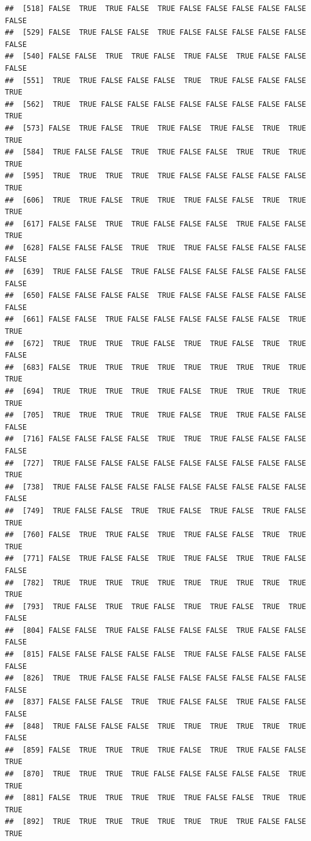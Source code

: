 \documentclass{article}\usepackage[]{graphicx}\usepackage[]{color}
\makeatletter
\newenvironment{kframe}{%
 \def\at@end@of@kframe{}%
 \ifinner\ifhmode%
  \def\at@end@of@kframe{\end{minipage}}%
  \begin{minipage}{\columnwidth}%
 \fi\fi%
 \def\FrameCommand##1{\hskip\@totalleftmargin \hskip-\fboxsep
 \colorbox{shadecolor}{##1}\hskip-\fboxsep
     \hskip-\linewidth \hskip-\@totalleftmargin \hskip\columnwidth}%
 \MakeFramed {\advance\hsize-\width
   \@totalleftmargin\z@ \linewidth\hsize
   \@setminipage}}%
 {\par\unskip\endMakeFramed%
 \at@end@of@kframe}
\newenvironment{knitrout}{}{} %
\makeatother
\begin{document}
\begin{knitrout}
\begin{kframe}
\begin{verbatim}
##  [518] FALSE  TRUE  TRUE FALSE  TRUE FALSE FALSE FALSE FALSE FALSE FALSE
##  [529] FALSE  TRUE FALSE FALSE  TRUE FALSE FALSE FALSE FALSE FALSE FALSE
##  [540] FALSE FALSE  TRUE  TRUE FALSE  TRUE FALSE  TRUE FALSE FALSE FALSE
##  [551]  TRUE  TRUE FALSE FALSE FALSE  TRUE  TRUE FALSE FALSE FALSE  TRUE
##  [562]  TRUE  TRUE FALSE FALSE FALSE FALSE FALSE FALSE FALSE FALSE  TRUE
##  [573] FALSE  TRUE FALSE  TRUE  TRUE FALSE  TRUE FALSE  TRUE  TRUE  TRUE
##  [584]  TRUE FALSE FALSE  TRUE  TRUE FALSE FALSE  TRUE  TRUE  TRUE  TRUE
##  [595]  TRUE  TRUE  TRUE  TRUE  TRUE FALSE FALSE FALSE FALSE FALSE  TRUE
##  [606]  TRUE  TRUE FALSE  TRUE  TRUE  TRUE FALSE FALSE  TRUE  TRUE  TRUE
##  [617] FALSE FALSE  TRUE  TRUE FALSE FALSE FALSE  TRUE FALSE FALSE  TRUE
##  [628] FALSE FALSE FALSE  TRUE  TRUE  TRUE FALSE FALSE FALSE FALSE FALSE
##  [639]  TRUE FALSE FALSE  TRUE FALSE FALSE FALSE FALSE FALSE FALSE FALSE
##  [650] FALSE FALSE FALSE FALSE  TRUE FALSE FALSE FALSE FALSE FALSE FALSE
##  [661] FALSE FALSE  TRUE FALSE FALSE FALSE FALSE FALSE FALSE  TRUE  TRUE
##  [672]  TRUE  TRUE  TRUE  TRUE FALSE  TRUE  TRUE FALSE  TRUE  TRUE FALSE
##  [683] FALSE  TRUE  TRUE  TRUE  TRUE  TRUE  TRUE  TRUE  TRUE  TRUE  TRUE
##  [694]  TRUE  TRUE  TRUE  TRUE  TRUE FALSE  TRUE  TRUE  TRUE  TRUE  TRUE
##  [705]  TRUE  TRUE  TRUE  TRUE  TRUE FALSE  TRUE  TRUE FALSE FALSE FALSE
##  [716] FALSE FALSE FALSE FALSE  TRUE  TRUE  TRUE FALSE FALSE FALSE FALSE
##  [727]  TRUE FALSE FALSE FALSE FALSE FALSE FALSE FALSE FALSE FALSE  TRUE
##  [738]  TRUE FALSE FALSE FALSE FALSE FALSE FALSE FALSE FALSE FALSE FALSE
##  [749]  TRUE FALSE FALSE  TRUE  TRUE FALSE  TRUE FALSE  TRUE FALSE  TRUE
##  [760] FALSE  TRUE  TRUE FALSE  TRUE  TRUE FALSE FALSE  TRUE  TRUE  TRUE
##  [771] FALSE  TRUE FALSE FALSE  TRUE  TRUE FALSE  TRUE  TRUE FALSE FALSE
##  [782]  TRUE  TRUE  TRUE  TRUE  TRUE  TRUE  TRUE  TRUE  TRUE  TRUE  TRUE
##  [793]  TRUE FALSE  TRUE  TRUE FALSE  TRUE  TRUE FALSE  TRUE  TRUE FALSE
##  [804] FALSE FALSE  TRUE FALSE FALSE FALSE FALSE  TRUE FALSE FALSE FALSE
##  [815] FALSE FALSE FALSE FALSE FALSE  TRUE FALSE FALSE FALSE FALSE FALSE
##  [826]  TRUE  TRUE FALSE FALSE FALSE FALSE FALSE FALSE FALSE FALSE FALSE
##  [837] FALSE FALSE FALSE  TRUE  TRUE FALSE FALSE  TRUE FALSE FALSE FALSE
##  [848]  TRUE FALSE FALSE FALSE  TRUE  TRUE  TRUE  TRUE  TRUE  TRUE FALSE
##  [859] FALSE  TRUE  TRUE  TRUE  TRUE FALSE  TRUE  TRUE FALSE FALSE  TRUE
##  [870]  TRUE  TRUE  TRUE  TRUE FALSE FALSE FALSE FALSE FALSE  TRUE  TRUE
##  [881] FALSE  TRUE  TRUE  TRUE  TRUE  TRUE FALSE FALSE  TRUE  TRUE  TRUE
##  [892]  TRUE  TRUE  TRUE  TRUE  TRUE  TRUE  TRUE  TRUE FALSE FALSE  TRUE

\end{verbatim}
\end{kframe}
\end{knitrout}
\end{document}
